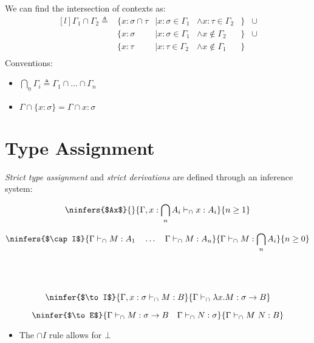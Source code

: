 We can find the intersection of contexts as:
\[\begin{matrix*}[l]
		\Gamma_1 \cap \Gamma_2 \triangleq & \{x: \sigma \cap \tau &| x:\sigma \in \Gamma_1 & \land x:\tau \in \Gamma_2 &\} & \cup \\
		& \{x : \sigma &| x : \sigma \in \Gamma_1 & \land x \not\in \Gamma_2 &\} & \cup \\
		& \{x : \tau &| x : \tau \in \Gamma_2 & \land x \not\in \Gamma_1 &\} & \\
	\end{matrix*}\]
Conventions:
\begin{itemize}
	\item $\bigcap_{\underline{n}}\Gamma_i \triangleq \Gamma_1 \cap \dots \cap \Gamma_n$
	\item $\Gamma \cap \{x:\sigma\} = \Gamma \cap x:\sigma$
\end{itemize}

\section{Type Assignment}
\textit{Strict type assignment} and \textit{strict derivations} are defined through an inference system:
\\ \begin{minipage}{.5\textwidth}
	\[\ninfers{$Ax$}{}{\Gamma, x: \bigcap_nA_i \vdash_\cap x : A_i}{n \geq 1}\]
\end{minipage}
\begin{minipage}{.5\textwidth}
	\[\ninfers{$\cap I$}{\Gamma \vdash_\cap M:A_1 \quad \dots \quad \Gamma \vdash_\cap M : A_n }{\Gamma \vdash_\cap M : \bigcap_nA_i}{n \geq 0}\]
\end{minipage}
\\ \vspace{2mm}
\\ \begin{minipage}{.5\textwidth}
	\[\ninfer{$\to I$}{
			\Gamma, x: \sigma \vdash_\cap M : B
		}{
			\Gamma \vdash_\cap \lambda x . M : \sigma \to B
		}\]
\end{minipage}
\begin{minipage}{.5\textwidth}
	\[\ninfer{$\to E$}{
			\Gamma \vdash_\cap M : \sigma \to B \quad \Gamma \vdash_\cap N : \sigma
		}{
			\Gamma \vdash_\cap M \ N : B
		}\]
\end{minipage}
\begin{itemize}
	\item The $\cap I$ rule allows for $\bot$
\end{itemize}

